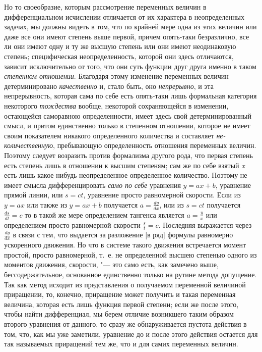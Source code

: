 \label{bkm:bm53c}Но то своеобразие, которым рассмотрение переменных величин в дифференциальном
исчислении отличается от их характера в неопределенных задачах, мы должны
видеть в том, что по крайней мере одна из этих величин или даже все они
имеют степень выше первой, причем опять-таки безразлично, все ли они имеют
одну и ту же высшую степень или они имеют неодинаковую степень;
специфическая неопределенность, которой они здесь отличаются, зависит
исключительно от того, что они суть функции друг друга именно в таком
{\em степенном отношении}. Благодаря этому изменение
переменных величин детерминировано {\em качественно} и,
стало быть, оно {\em непрерывно}, и эта непрерывность,
которая сама по себе есть опять-таки лишь формальная категория некоторого
{\em тождества} вообще, некоторой сохраняющейся в
изменении, остающейся саморавною определенности, имеет здесь свой
детерминированный смысл, и притом единственно только в степенном отношении,
которое не имеет своим показателем никакого определенного количества и
составляет {\em не-количественную}, пребывающую
определенность отношения переменных величин. Поэтому следует возразить
против формализма другого рода, что первая степень есть степень лишь в
отношении к высшим степеням; сам же по себе взятый
{\em x} есть лишь какое-нибудь неопределенное
определенное количество. Поэтому не имеет смысла дифференцировать
{\em само по себе} уравнения $y=ax+b$,
уравнение прямой линии, или $s=ct$, уравнение просто равномерной
скорости. Если из $y=ax$ или также из $y=ax+b$ 
получается $a=\frac{dy}{dx}$, или из $s=ct$ 
получается $\frac{ds}{dt}=c$ то в такой же мере
определением тангенса является $a=\frac y x$ или определением просто
равномерной скорости $\frac s t=c$. Последняя выражается через 
$\frac{dy}{dx}$ в связи с тем, что выдается за
разложение [в ряд] формулы равномерно ускоренного движения. Но что в
системе такого движения встречается момент простой, просто
равномерной, т.~е. не определенной высшею степенью одного из моментов
движения, скорости, "--- это само есть, как замечено выше, бессодержательное,
основанное единственно только на рутине метода допущение. Так как метод
исходит из представления о получаемом переменной величиной приращении, то,
конечно, приращение может получить и такая переменная величина, которая
есть лишь функция первой степени; если же после этого, чтобы найти
дифференциал, мы берем отличие возникшего таким образом второго уравнения от
данного, то сразу же обнаруживается пустота действия в том, что, как мы уже
заметили, уравнение до и после этого действия остается для так называемых
приращений тем же, что и для самих переменных величин.

